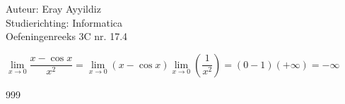 \documentclass[a4paper]{article}
\begin{document}
\noindent \large Auteur: Eray Ayyildiz \\
\noindent \large Studierichting: Informatica\\
\noindent \large Oefeningenreeks 3C nr. 17.4\\

\medskip
\normalsize

$\lim\limits_{x \to 0} \dfrac{x - \cos x}{x^2} =
 \lim\limits_{x \to 0} \left(x-\cos x \right) \lim\limits_{x \to 0} \left(\dfrac{1}{x^2}\right) 
 = \left(0-1\right)  (+\infty )
 = -\infty $

\begin{thebibliography}{999}
\end{thebibliography}
\end{document}

